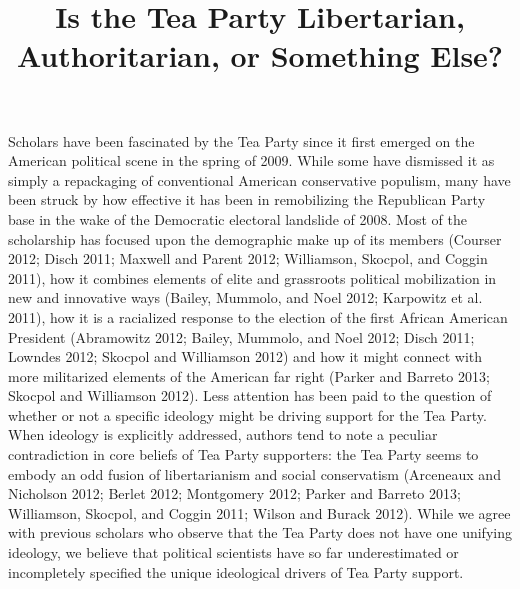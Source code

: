 \documentclass[12pt,]{article}
\title{Is the Tea Party Libertarian, Authoritarian, or Something Else?
\vspace{1.25em}}
\author{}
\date{}
\begin{document}
\maketitle



\newpage

\doublespacing

Scholars have been fascinated by the Tea Party since it first emerged on
the American political scene in the spring of 2009. While some have
dismissed it as simply a repackaging of conventional American
conservative populism, many have been struck by how effective it has
been in remobilizing the Republican Party base in the wake of the
Democratic electoral landslide of 2008. Most of the scholarship has
focused upon the demographic make up of its members (Courser 2012; Disch
2011; Maxwell and Parent 2012; Williamson, Skocpol, and Coggin 2011),
how it combines elements of elite and grassroots political mobilization
in new and innovative ways (Bailey, Mummolo, and Noel 2012; Karpowitz et
al. 2011), how it is a racialized response to the election of the first
African American President (Abramowitz 2012; Bailey, Mummolo, and Noel
2012; Disch 2011; Lowndes 2012; Skocpol and Williamson 2012) and how it
might connect with more militarized elements of the American far right
(Parker and Barreto 2013; Skocpol and Williamson 2012). Less attention
has been paid to the question of whether or not a specific ideology
might be driving support for the Tea Party. When ideology is explicitly
addressed, authors tend to note a peculiar contradiction in core beliefs
of Tea Party supporters: the Tea Party seems to embody an odd fusion of
libertarianism and social conservatism (Arceneaux and Nicholson 2012;
Berlet 2012; Montgomery 2012; Parker and Barreto 2013; Williamson,
Skocpol, and Coggin 2011; Wilson and Burack 2012). While we agree with
previous scholars who observe that the Tea Party does not have one
unifying ideology, we believe that political scientists have so far
underestimated or incompletely specified the unique ideological drivers
of Tea Party support.
\end{document}
